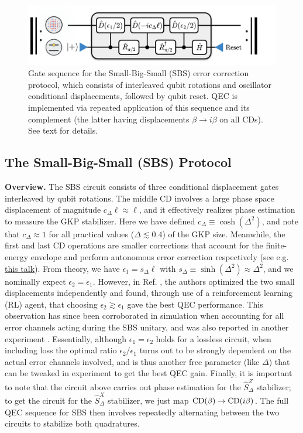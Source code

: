\begin{figure}[h]
    \centering
    \includegraphics[width=0.85\linewidth]{Figures/2/SBS.pdf}
    \caption{Gate sequence for the Small-Big-Small (SBS) error correction protocol, which consists of interleaved qubit rotations and oscillator conditional displacements, followed by qubit reset. QEC is implemented via repeated application of this sequence and its complement (the latter having displacements $\beta \to i\beta$ on all CDs). See text for details.}
    \label{fig:2-SBS}
\end{figure}

\subsection{The Small-Big-Small (SBS) Protocol\label{sec:2_SBS}}
\textbf{Overview.} The SBS circuit consists of three conditional displacement gates interleaved by qubit rotations. The middle CD involves a large phase space displacement of magnitude $c_\Delta \ell \approx \ell$, and it effectively realizes phase estimation to measure the GKP stabilizer. Here we have defined $c_\Delta \equiv \cosh(\Delta^2)$, and note that $c_\Delta \approx 1$ for all practical values ($\Delta \lesssim 0.4$) of the GKP size. Meanwhile, the first and last CD operations are smaller corrections that account for the finite-energy envelope and perform autonomous error correction respectively (see e.g. \href{https://youtu.be/TOQzHkgsH_E?t=1045}{this talk}). From theory, we have $\epsilon_1 = s_\Delta \ell$ with $s_\Delta \equiv \sinh(\Delta^2) \approx \Delta^2$, and we nominally expect $\epsilon_2 = \epsilon_1$. However, in Ref. \cite{sivak2023gkp-expt}, the authors optimized the two small displacements independently and found, through use of a reinforcement learning (RL) agent, that choosing $\epsilon_2 \gtrsim \epsilon_1$ gave the best QEC performance. This observation has since been corroborated in simulation when accounting for all error channels acting during the SBS unitary, and was also reported in another experiment \cite{nordquantique2023gkp-expt}. Essentially, although $\epsilon_1 = \epsilon_2$ holds for a lossless circuit, when including loss the optimal ratio $\epsilon_2/\epsilon_1$ turns out to be strongly dependent on the actual error channels involved, and is thus another free parameter (like $\Delta$) that can be tweaked in experiment to get the best QEC gain. Finally, it is important to note that the circuit above carries out phase estimation for the $\hat{S}_\Delta^{Z}$ stabilizer; to get the circuit for the $\hat{S}_\Delta^{X}$ stabilizer, we just map ${\rm CD}(\beta) \to {\rm CD}(i\beta)$. The full QEC sequence for SBS then involves repeatedly alternating between the two circuits to stabilize both quadratures. 


